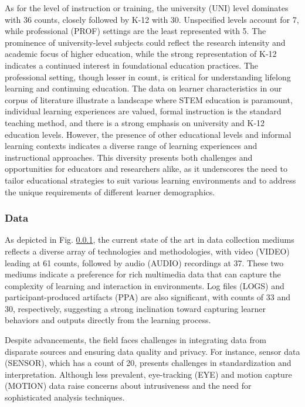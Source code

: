 \documentclass[manuscript,screen,review]{acmart}
\begin{document}
As for the level of instruction or training, the university (UNI) level dominates with 36 counts, closely followed by K-12 with 30. Unspecified levels account for 7, while professional (PROF) settings are the least represented with 5. The prominence of university-level subjects could reflect the research intensity and academic focus of higher education, while the strong representation of K-12 indicates a continued interest in foundational education practices. The professional setting, though lesser in count, is critical for understanding lifelong learning and continuing education.
The data on learner characteristics in our corpus of literature illustrate a landscape where STEM education is paramount, individual learning experiences are valued, formal instruction is the standard teaching method, and there is a strong emphasis on university and K-12 education levels. However, the presence of other educational levels and informal learning contexts indicates a diverse range of learning experiences and instructional approaches. This diversity presents both challenges and opportunities for educators and researchers alike, as it underscores the need to tailor educational strategies to suit various learning environments and to address the unique requirements of different learner demographics.


\subsubsection{Data}

As depicted in Fig. \ref{}, the current state of the art in data collection mediums reflects a diverse array of technologies and methodologies, with video (VIDEO) leading at 61 counts, followed by audio (AUDIO) recordings at 37. These two mediums indicate a preference for rich multimedia data that can capture the complexity of learning and interaction in environments. Log files (LOGS) and participant-produced artifacts (PPA) are also significant, with counts of 33 and 30, respectively, suggesting a strong inclination toward capturing learner behaviors and outputs directly from the learning process.

Despite advancements, the field faces challenges in integrating data from disparate sources and ensuring data quality and privacy. For instance, sensor data (SENSOR), which has a count of 20, presents challenges in standardization and interpretation. Although less prevalent, eye-tracking (EYE) and motion capture (MOTION) data raise concerns about intrusiveness and the need for sophisticated analysis techniques.
\end{document}
